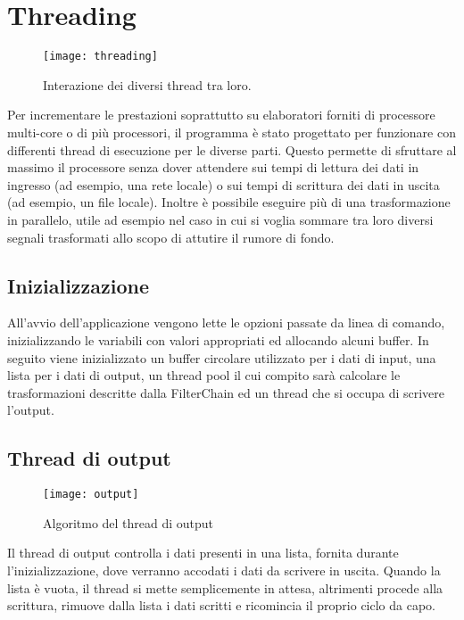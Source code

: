 \section{Threading}
\begin{figure}[htb]
	\begin{center}
		\texttt{[image: threading]}
	\end{center}
	\caption{Interazione dei diversi thread tra loro.}
	\label{fig:threading}
\end{figure}
Per incrementare le prestazioni soprattutto su elaboratori forniti di processore
multi-core o di pi\`u processori, il programma \`e stato progettato per
funzionare con differenti thread di esecuzione per le diverse parti. Questo
permette di sfruttare al massimo il processore senza dover attendere sui tempi
di lettura dei dati in ingresso (ad esempio, una rete locale) o sui tempi di
scrittura dei dati in uscita (ad esempio, un file locale). Inoltre \`e possibile
eseguire pi\`u di una trasformazione in parallelo, utile ad esempio nel caso in
cui si voglia sommare tra loro diversi segnali trasformati allo scopo di
attutire il rumore di fondo.

\subsection{Inizializzazione}
All'avvio dell'applicazione vengono lette le opzioni passate da linea di
comando, inizializzando le variabili con valori appropriati ed allocando alcuni
buffer. In seguito viene inizializzato un buffer circolare utilizzato per i
dati di input, una lista per i dati di output, un thread pool il cui compito
sar\`a calcolare le trasformazioni descritte dalla FilterChain ed un thread che
si occupa di scrivere l'output.

\subsection{Thread di output}
\begin{figure}[htb]
	\begin{center}
		\texttt{[image: output]}
	\end{center}
	\caption{Algoritmo del thread di output}
	\label{fig:output}
\end{figure}
Il thread di output controlla i dati presenti in una lista, fornita durante
l'inizializzazione, dove verranno accodati i dati da scrivere in uscita. Quando
la lista \`e vuota, il thread si mette semplicemente in attesa, altrimenti
procede alla scrittura, rimuove dalla lista i dati scritti e ricomincia il
proprio ciclo da capo.

